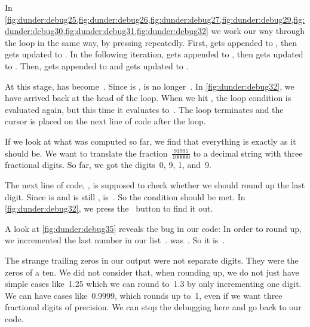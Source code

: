 In \cref{fig:dunder:debug25,fig:dunder:debug26,fig:dunder:debug27,fig:dunder:debug29,fig:dunder:debug30,fig:dunder:debug31,fig:dunder:debug32} we work our way through the loop in the same way, by pressing  repeatedly.
First,  gets appended to , then  gets updated to .
In the following iteration,  gets appended to , then  gets updated to .
Then,  gets appended to  and  gets updated to .

At this stage,  has become~\pythonil{[0, 9, 1, 9]}.
Since  is ,  is no longer~.
In \cref{fig:dunder:debug32}, we have arrived back at the head of the loop.
When we hit , the loop condition is evaluated again, but this time it evaluates to~.
The loop terminates and the cursor is placed on the next line of code after the loop.

If we look at what was computed so far, we find that everything is exactly as it should be.
We want to translate the fraction~$\frac{91995}{100000}$ to a decimal string with three fractional digits.
So far, we got the digits~0, 9, 1, and~9.

The next line of code, , is supposed to check whether we should round up the last digit.
Since  is  and  is still ,  is~.
So the condition should be met.
In \cref{fig:dunder:debug32}, we press the \pycharmDebuggerStepOver~button to find it out.

A look at \cref{fig:dunder:debug35} reveals the bug in our code:
In order to round up, we incremented the last number in our list~.
 was~\pythonil{[0, 9, 1, 9]}.
So it is~\pythonil{[0, 9, 1, 10]}.

The strange trailing zeros in our output were not separate digits.
They were the zeros of a ten.
We did not consider that, when rounding up, we do not just have simple cases like~1.25 which we can round to~1.3 by only incrementing one digit.
We can have cases like~0.9999, which rounds up to~1, even if we want three fractional digits of precision.
We can stop the debugging here and go back to our code.%
\clearpage%
%
%

